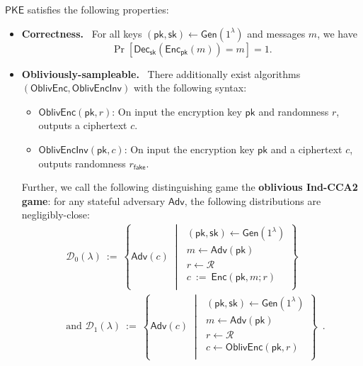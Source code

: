 \documentclass[11pt,letterpaper]{article}
\renewcommand{\emph}[1]{\textbf{#1}~}
\theoremstyle{plain} %
\theoremstyle{definition} %
\theoremstyle{remark} %
\newcommand{\eqdef}{\ {:=} \ }
\newcommand{\SecParam}{\lambda}
\newcommand{\PKE}{\mathsf{PKE}}
\newcommand{\Gen}{\mathsf{Gen}}
\newcommand{\Enc}{\mathsf{Enc}}
\newcommand{\OblivEnc}{\mathsf{OblivEnc}}
\newcommand{\OblivEncInv}{\mathsf{OblivEncInv}}
\newcommand{\Dec}{\mathsf{Dec}}
\newcommand{\EncKey}{\mathsf{pk}}
\newcommand{\DecKey}{\mathsf{sk}}
\newcommand{\Msg}{m}
\newcommand{\Ciphertext}{c}
\newcommand{\Rand}{r}
\newcommand{\FakeRand}{r_{\mathsf{fake}}}
\newcommand{\Distribution}{\mathcal{D}}
\newcommand{\RandSpace}{\mathcal{R}}
\newcommand{\Adversary}{{\mathsf{Adv}}} %
\newcommand{\pST}{\; \middle| \;}
\begin{document}
$\PKE$ satisfies the following properties:
\begin{itemize}
    \item \emph{Correctness.} For all keys $(\EncKey, \DecKey) \gets \Gen(1^{\SecParam})$ and messages $\Msg$, we have
    \[ \Pr[ \Dec_{\DecKey} (\Enc_{\EncKey} (\Msg)) = \Msg ] = 1. \]

    \item \emph{Obliviously-sampleable.} There additionally exist algorithms $(\OblivEnc, \OblivEncInv)$ with the following syntax:
    \begin{itemize}
    	\item $\OblivEnc(\EncKey,\Rand)$: On input the encryption key $\EncKey$ and randomness $\Rand$, outputs a ciphertext $\Ciphertext$.
    	\item $\OblivEncInv(\EncKey,\Ciphertext)$: On input the encryption key $\EncKey$ and a ciphertext $\Ciphertext$, outputs randomness $\FakeRand$.
    \end{itemize}

    Further, we call the following distinguishing game the \textbf{oblivious Ind-CCA2 game}: for any stateful adversary $\Adversary$, the following distributions are negligibly-close:
    \begin{align*}
		&\Distribution_0(\SecParam) \eqdef \left\{
		\Adversary(\Ciphertext)
		\pST
		\begin{array}{r}
            (\EncKey,\DecKey)\gets \Gen(1^\SecParam)\\
			\Msg \gets \Adversary(\EncKey)\\
            \Rand \gets \RandSpace\\
			\Ciphertext \eqdef \Enc(\EncKey,\Msg;\Rand)\\
		\end{array}
		\right\} \\
		&\text{and } \Distribution_1(\SecParam) \eqdef \left\{
		\Adversary(\Ciphertext)
		\pST
		\begin{array}{r}
            (\EncKey,\DecKey)\gets \Gen(1^\SecParam)\\
            \Msg \gets \Adversary(\EncKey)\\
            \Rand \gets \RandSpace\\
            \Ciphertext \gets \OblivEnc(\EncKey,\Rand)\\
		\end{array}
		\right\} \enspace.
	\end{align*}
\end{itemize}
\end{document}
